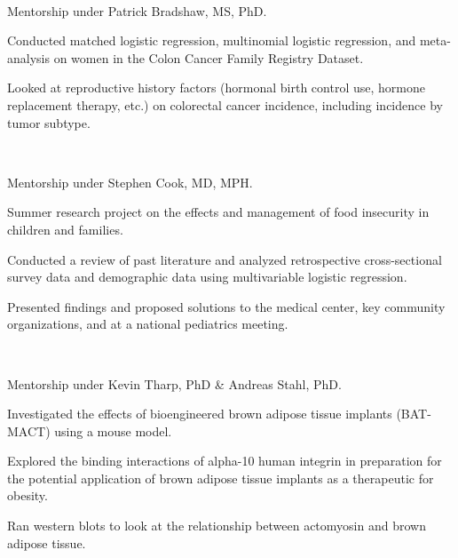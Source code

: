 \\
\begin{tightemize}
\item Mentorship under Patrick Bradshaw, MS, PhD.
\item Conducted matched logistic regression, multinomial logistic regression, and meta-analysis on women in the Colon Cancer Family Registry Dataset.
\item Looked at reproductive history factors (hormonal birth control use, hormone replacement therapy, etc.) on colorectal cancer incidence, including incidence by tumor subtype.
\end{tightemize}
\sectionsep


\\
\begin{tightemize}
\item Mentorship under Stephen Cook, MD, MPH.
\item Summer research project on the effects and management of food insecurity in children and families.
\item Conducted a review of past literature and analyzed retrospective cross-sectional survey data and demographic data using multivariable logistic regression.
\item Presented findings and proposed solutions to the medical center, key community organizations, and at a national pediatrics meeting.
\end{tightemize}
\sectionsep
\sectionsep
{} \\
\begin{tightemize}
\item Mentorship under Kevin Tharp, PhD \& Andreas Stahl, PhD.
\item Investigated the effects of bioengineered brown adipose tissue implants (BAT-MACT) using a mouse model.
\item Explored the binding interactions of alpha-10 human integrin in preparation for the potential application of brown adipose tissue implants as a therapeutic for obesity.
\item Ran western blots to look at the relationship between actomyosin and brown adipose tissue.
\end{tightemize}
\sectionsep

